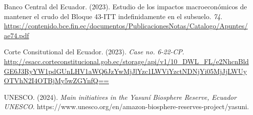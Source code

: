 \documentclass[
]{article}
\newlength{\cslhangindent}
\newenvironment{CSLReferences}[2] %
 {\begin{list}{}{%
  \setlength{\itemindent}{0pt}
  \setlength{\leftmargin}{0pt}
  \setlength{\parsep}{0pt}
  \ifodd #1
   \setlength{\leftmargin}{\cslhangindent}
   \setlength{\itemindent}{-1\cslhangindent}
  \fi
  \setlength{\itemsep}{#2\baselineskip}}}
 {\end{list}}
\begin{document}
\label{refs}
\begin{CSLReferences}{1}{0}
Banco Central del Ecuador. (2023). Estudio de los impactos
macroeconómicos de mantener el crudo del Bloque 43-ITT indefinidamente
en el subsuelo. \emph{74}.
\url{https://contenido.bce.fin.ec/documentos/PublicacionesNotas/Catalogo/Apuntes/ae74.pdf}

Corte Consitutional del Ecuador. (2023). \emph{Case no. 6-22-CP}.
\url{http://esacc.corteconstitucional.gob.ec/storage/api/v1/10_DWL_FL/e2NhcnBldGE6J3RyYW1pdGUnLHV1aWQ6JzYwMjJlYzc1LWViYzctNDNjYi05MjJjLWUyOTVhN2I4OTBjMy5wZGYnfQ==}

UNESCO. (2024). \emph{Main initiatives in the {Yasun{í} Biosphere
Reserve}, {Ecuador} {\textbar} {UNESCO}}.
https://www.unesco.org/en/amazon-biosphere-reserves-project/yasuni.

\end{CSLReferences}
\end{document}

